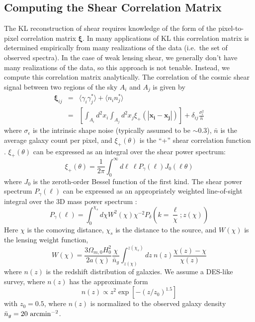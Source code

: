 \documentclass[twocolumn]{emulateapj}
\newcommand{\myvec}[1]{\boldsymbol{#1}}
\begin{document}
\subsection{Computing the Shear Correlation Matrix}
\label{Shear_Correlation}
The KL reconstruction of shear requires knowledge of the
form of the pixel-to-pixel correlation matrix $\myvec\xi$.  
In many applications of KL
\citep[e.g.~analysis of galaxy spectra,][]{Connolly95} 
this correlation matrix is
determined empirically from many realizations of the data (i.e.~the set
of observed spectra).  In the case of weak lensing shear, we generally
don't have many realizations of the data, so this approach is not
tenable.  Instead, we compute this correlation matrix analytically.  The 
correlation of the cosmic shear signal between two regions of the sky
$A_i$ and $A_j$ is given by
\begin{eqnarray}
  \label{xi_analytic}
  \myvec{\xi}_{ij} 
  &=& \langle\gamma_i\gamma_j^*\rangle + 
  \langle n_in_j^*\rangle\nonumber\\
  &=& \left[\int_{A_i}d^2x_i\int_{A_j}d^2x_j 
    \xi_+(|\myvec{x_i}-\myvec{x_j}|)\right]
  + \delta_{ij}\frac{\sigma_\epsilon^2}{\bar{n}}
\end{eqnarray}
where $\sigma_\epsilon$ is the intrinsic shape noise (typically assumed to 
be $\sim 0.3$), $\bar{n}$ is the average galaxy count per pixel, and 
$\xi_+(\theta)$ is the ``+'' shear correlation function \citep{Schneider02}. 
$\xi_+(\theta)$ can be expressed as an integral over the shear power spectrum:
\begin{equation}
  \label{xi_plus_def}
  \xi_+(\theta) 
  = \frac{1}{2\pi} \int_0^\infty d\ell\ \ell P_\gamma(\ell) J_0(\ell\theta)
\end{equation}
where $J_0$ is the zeroth-order Bessel function of the first kind.  The 
shear power spectrum $P_\gamma(\ell)$ can be expressed as an 
appropriately weighted line-of-sight integral over the 3D mass power 
spectrum \citep[see, e.g.][]{Takada04}:
\begin{equation}
  \label{P_gamma}
  P_\gamma(\ell) = \int_0^{\chi_s}d\chi W^2(\chi)\chi^{-2}
  P_\delta\left(k=\frac{\ell}{\chi};z(\chi)\right)
\end{equation}
Here $\chi$ is the comoving distance, $\chi_s$ is the distance to the
source, and $W(\chi)$ is the lensing weight function,
\begin{equation}
  \label{Lensing_Weight}
  W(\chi) = \frac{3\Omega_{m,0}H_0^2}{2a(\chi)}\frac{\chi}{\bar{n}_g}
  \int_{z(\chi)}^{z(\chi_s)}dz\ n(z) \frac{\chi(z)-\chi}{\chi(z)}
\end{equation}
where $n(z)$ is the redshift distribution of galaxies.  We assume a
DES-like survey, where $n(z)$ has the approximate form
\begin{equation}
  \label{Number_Distribution}
  n(z) \propto z^2 \exp[-(z/z_0)^{1.5}]
\end{equation}
with $z_0 = 0.5$, where $n(z)$ is normalized to the observed galaxy density
$\bar{n}_g = 20\ {\rm arcmin}^{-2}$.
\end{document}

